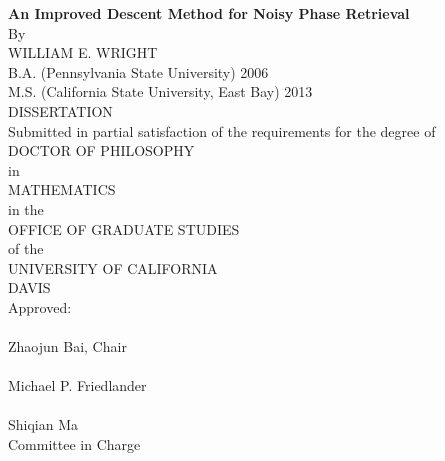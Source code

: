 \begin{center}
   \null\vfill
   \textbf{%
      An Improved Descent Method for Noisy Phase Retrieval
   }%
   \\
   \bigskip
   By \\
   \bigskip
   WILLIAM E. WRIGHT \\
   \bigskip
   B.A. (Pennsylvania State University) 2006 \\
   M.S. (California State University, East Bay) 2013 \\
   \bigskip
   DISSERTATION \\
   \bigskip
   Submitted in partial satisfaction of the requirements for the
   degree of \\
   \bigskip
   DOCTOR OF PHILOSOPHY \\
   \bigskip
   in \\
   \bigskip
   MATHEMATICS\\
   \bigskip
   in the \\
   \bigskip
   OFFICE OF GRADUATE STUDIES \\
   \bigskip        
   of the \\
   \bigskip
   UNIVERSITY OF CALIFORNIA \\
   \bigskip
   DAVIS \\
   \bigskip
   Approved: \\
   \bigskip
   \bigskip
   \makebox[3in]{\hrulefill} \\
   Zhaojun Bai, Chair \\
   \bigskip
   \bigskip
   \makebox[3in]{\hrulefill} \\
   Michael P. Friedlander \\
   \bigskip
   \bigskip
   \makebox[3in]{\hrulefill} \\
   Shiqian Ma \\
   \bigskip
   Committee in Charge \\
    \\
   \vfill
\end{center}
